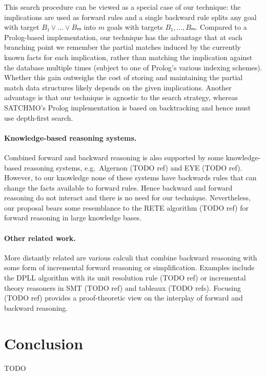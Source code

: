 \documentclass[runningheads]{llncs}
\newcommand{\xcom}[1]{{\color{cyan}{Xavier: #1}} }
\newcommand{\jcom}[1]{{\color{orange}{Jannis: #1}} }
\begin{document}
This search procedure can be viewed as a special case of our technique: the implications are used as forward rules and a single backward rule splits any goal with target $B₁ ∨ \dots ∨ Bₘ$ into $m$ goals with targets $B₁, \dots, Bₘ$.
Compared to a Prolog-based implementation, our technique has the advantage that at each branching point we remember the partial matches induced by the currently known facts for each implication, rather than matching the implication against the database multiple times (subject to one of Prolog's various indexing schemes).
Whether this gain outweighs the cost of storing and maintaining the partial match data structures likely depends on the given implications.
Another advantage is that our technique is agnostic to the search strategy, whereas SATCHMO's Prolog implementation is based on backtracking and hence must use depth-first search.

\paragraph{Knowledge-based reasoning systems.}
Combined forward and backward reasoning is also supported by some knowledge-based reasoning systems, e.g.\ Algernon (TODO ref) and EYE (TODO ref).
However, to our knowledge none of these systems have backwards rules that can change the facts available to forward rules.
Hence backward and forward reasoning do not interact and there is no need for our technique.
Nevertheless, our proposal bears some resemblance to the RETE algorithm (TODO ref) for forward reasoning in large knowledge bases.

\paragraph{Other related work.}
More distantly related are various calculi that combine backward reasoning with some form of incremental forward reasoning or simplification.
Examples include the DPLL algorithm with its unit resolution rule (TODO ref) or incremental theory reasoners in SMT (TODO ref) and tableaux (TODO refs).
Focusing (TODO ref) provides a proof-theoretic view on the interplay of forward and backward reasoning.

\jcom{auto2}
\jcom{Mention ACL2 forward rule triggers}

\section{Conclusion}

\xcom{Do we want to add potential improvements? Like an index closer to the naive algorithm.}

TODO
\end{document}
